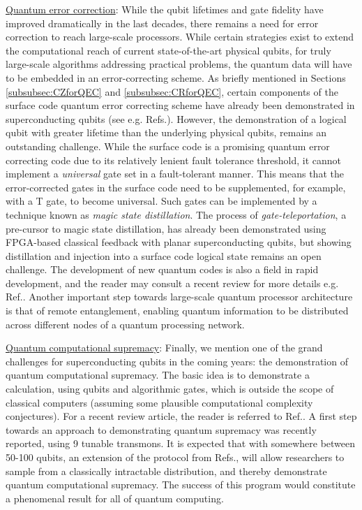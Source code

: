 \documentclass[aip,apr,twocolumn,showpacs,superscriptaddress,groupedaddress,nofootinbib,reprint]{revtex4-1}  %
\begin{document}
\underline{Quantum error correction}: While the qubit lifetimes and gate fidelity have improved dramatically in the last decades, there remains a need for error correction to reach large-scale processors. While certain strategies exist to extend the computational reach of current state-of-the-art physical qubits\cite{Kandala2018}, for truly large-scale algorithms addressing practical problems, the quantum data will have to be embedded in an error-correcting scheme. As briefly mentioned in Sections \ref{subsubsec:CZforQEC} and \ref{subsubsec:CRforQEC}, certain components of the surface code quantum error correcting scheme have already been demonstrated in superconducting qubits (see e.g. Refs.). However, the demonstration of a logical qubit with greater lifetime than the underlying physical qubits, remains an outstanding challenge. While the surface code is a promising quantum error correcting code due to its relatively lenient fault tolerance threshold, it cannot implement a \emph{universal} gate set in a fault-tolerant manner. This means that the error-corrected gates in the surface code need to be supplemented, for example, with a \textsf{T} gate, to become universal. Such gates can be implemented by a technique known as \emph{magic state distillation}\cite{Bravyi2005}. The process of \emph{gate-teleportation}, a pre-cursor to magic state distillation, has already been demonstrated using FPGA-based classical feedback with planar superconducting qubits\cite{Ryan2017}, but showing distillation and injection into a surface code logical state remains an open challenge. The development of new quantum codes is also a field in rapid development, and the reader may consult a recent review for more details e.g. Ref.. Another important step towards large-scale quantum processor architecture is that of remote entanglement, enabling quantum information to be distributed across different nodes of a quantum processing network\cite{Axline2018,Kurpiers2018}.

\underline{Quantum computational supremacy}: Finally, we mention one of the grand challenges for superconducting qubits in the coming years: the demonstration of quantum computational supremacy\cite{Preskill2012}. The basic idea is to demonstrate a calculation, using qubits and algorithmic gates, which is outside the scope of classical computers (assuming some plausible computational complexity conjectures). For a recent review article, the reader is referred to Ref.\cite{Harrow2017}. A first step towards an approach to demonstrating quantum supremacy was recently reported, using 9 tunable transmons\cite{Neill2018}. It is expected that with somewhere between 50-100 qubits\cite{Dalzell2018}, an extension of the protocol from Refs., will allow researchers to sample from a classically intractable distribution, and thereby demonstrate quantum computational supremacy. The success of this program would constitute a phenomenal result for all of quantum computing.
\end{document}
